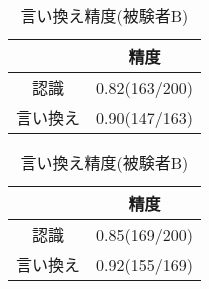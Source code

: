 \documentclass{nlp}
\begin{document}
\begin{table}[h]
 
 \begin{center}

  
  \begin{minipage}{50mm}
   \begin{center}
    \caption{言い換え精度(被験者A)}
    \label{table:result2-1}
    \vspace{1mm}
    \begin{tabular}{c|c} \hline
            &         精度 \\ \hline
   認識     & 0.82(163/200) \\ \hline
   言い換え & 0.90(147/163) \\ \hline
    \end{tabular}
   \end{center}
  \end{minipage}
  
  \hspace{1mm}
  
  \begin{minipage}{50mm}
   \begin{center}
    \caption{言い換え精度(被験者B)}
    \label{table:result2-2}
    \vspace{1mm}
  \begin{tabular}{c|c} \hline
            & 精度          \\ \hline
   認識     & 0.85(169/200) \\ \hline
   言い換え & 0.92(155/169) \\ \hline
  \end{tabular}
   \end{center}
  \end{minipage}
  
 \end{center}
\end{table}
\end{document}
